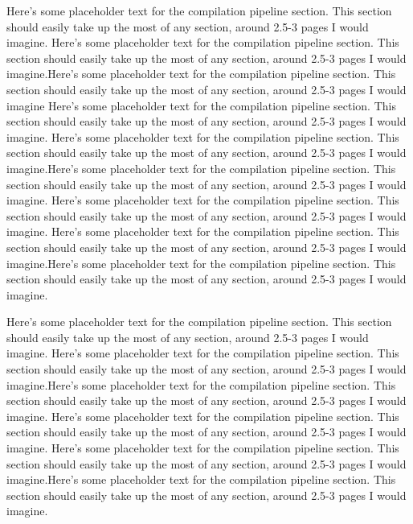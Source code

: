 \documentclass[preprint]{sigplanconf}
\begin{document}
Here's some placeholder text for the compilation pipeline section.  This
section should easily take up the most of any section, around 2.5-3 pages I
would imagine.
Here's some placeholder text for the compilation pipeline section.  This
section should easily take up the most of any section, around 2.5-3 pages I
would imagine.Here's some placeholder text for the compilation pipeline section.
 This
section should easily take up the most of any section, around 2.5-3 pages I
would imagine
Here's some placeholder text for the compilation pipeline section.  This
section should easily take up the most of any section, around 2.5-3 pages I
would imagine.
Here's some placeholder text for the compilation pipeline section.  This
section should easily take up the most of any section, around 2.5-3 pages I
would imagine.Here's some placeholder text for the compilation pipeline section.
 This
section should easily take up the most of any section, around 2.5-3 pages I
would imagine.
Here's some placeholder text for the compilation pipeline section.  This
section should easily take up the most of any section, around 2.5-3 pages I
would imagine.
Here's some placeholder text for the compilation pipeline section.  This
section should easily take up the most of any section, around 2.5-3 pages I
would imagine.Here's some placeholder text for the compilation pipeline section.
 This
section should easily take up the most of any section, around 2.5-3 pages I
would imagine.

Here's some placeholder text for the compilation pipeline section.  This
section should easily take up the most of any section, around 2.5-3 pages I
would imagine.
Here's some placeholder text for the compilation pipeline section.  This
section should easily take up the most of any section, around 2.5-3 pages I
would imagine.Here's some placeholder text for the compilation pipeline section.
 This
section should easily take up the most of any section, around 2.5-3 pages I
would imagine.
Here's some placeholder text for the compilation pipeline section.  This
section should easily take up the most of any section, around 2.5-3 pages I
would imagine.
Here's some placeholder text for the compilation pipeline section.  This
section should easily take up the most of any section, around 2.5-3 pages I
would imagine.Here's some placeholder text for the compilation pipeline section.
 This
section should easily take up the most of any section, around 2.5-3 pages I
would imagine.
\end{document}
